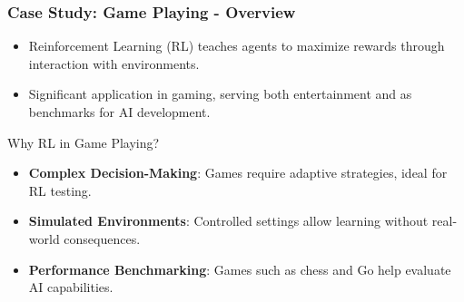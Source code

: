 \documentclass[aspectratio=169]{beamer}
\begin{document}
\begin{frame}[fragile]
    \frametitle{Case Study: Game Playing - Overview}
    \begin{itemize}
        \item Reinforcement Learning (RL) teaches agents to maximize rewards through interaction with environments.
        \item Significant application in gaming, serving both entertainment and as benchmarks for AI development.
    \end{itemize}
    \begin{block}{Why RL in Game Playing?}
        \begin{itemize}
            \item \textbf{Complex Decision-Making}: Games require adaptive strategies, ideal for RL testing.
            \item \textbf{Simulated Environments}: Controlled settings allow learning without real-world consequences.
            \item \textbf{Performance Benchmarking}: Games such as chess and Go help evaluate AI capabilities.
        \end{itemize}
    \end{block}
\end{frame}
\end{document}
